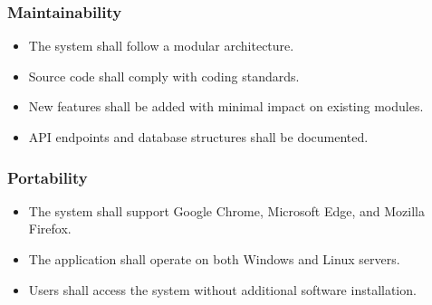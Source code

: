 
\subsubsection{Maintainability}

\begin{itemize}
    \item The system shall follow a modular architecture.
    
    \item Source code shall comply with coding standards.
    
    \item New features shall be added with minimal impact on existing modules.
    
    \item API endpoints and database structures shall be documented.
\end{itemize}


\subsubsection{Portability}

\begin{itemize}
    \item The system shall support Google Chrome, Microsoft Edge, and Mozilla Firefox.
    
    \item The application shall operate on both Windows and Linux servers.
    
    \item Users shall access the system without additional software installation.
\end{itemize}